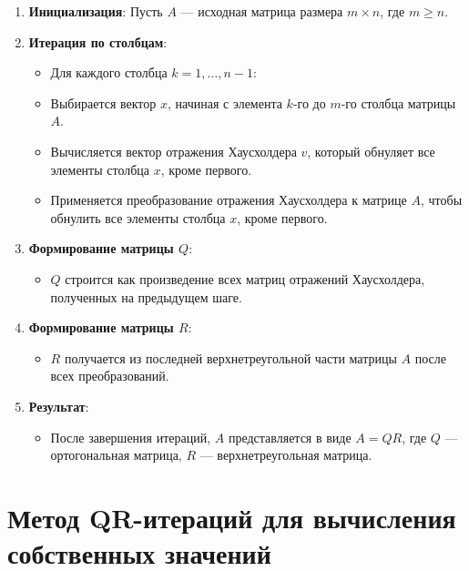 \documentclass{article}
\begin{document}
\begin{enumerate}
  \item \textbf{Инициализация}: Пусть \( A \) — исходная матрица размера \( m \times n \), где \( m \geq n \).
  
  \item \textbf{Итерация по столбцам}:
    \begin{itemize}
      \item Для каждого столбца \( k = 1, \ldots, n-1 \):
      \item Выбирается вектор \( x \), начиная с элемента \( k \)-го до \( m \)-го столбца матрицы \( A \).
      \item Вычисляется вектор отражения Хаусхолдера \( v \), который обнуляет все элементы столбца \( x \), кроме первого.
      \item Применяется преобразование отражения Хаусхолдера к матрице \( A \), чтобы обнулить все элементы столбца \( x \), кроме первого.
    \end{itemize}
  
  \item \textbf{Формирование матрицы \( Q \)}:
    \begin{itemize}
      \item \( Q \) строится как произведение всех матриц отражений Хаусхолдера, полученных на предыдущем шаге.
    \end{itemize}
  
  \item \textbf{Формирование матрицы \( R \)}:
    \begin{itemize}
      \item \( R \) получается из последней верхнетреугольной части матрицы \( A \) после всех преобразований.
    \end{itemize}
  
  \item \textbf{Результат}:
    \begin{itemize}
      \item После завершения итераций, \( A \) представляется в виде \( A = QR \), где \( Q \) — ортогональная матрица, \( R \) — верхнетреугольная матрица.
    \end{itemize}
\end{enumerate}

\section*{Метод QR-итераций для вычисления собственных значений}
\end{document}
